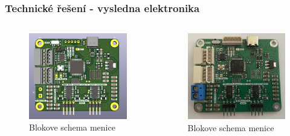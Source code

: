\documentclass[%
  12pt,       				%
	t,                  %
	aspectratio=1610,   %
	unicode,						%
]{beamer}				    	%
\begin{document}
\begin{frame}
	\frametitle{Technické řešení - vysledna elektronika}
	\begin{columns}[T] 								%
		\begin{column}{0.5\textwidth}		%
			\begin{figure}%
				\centering	              %
				\includegraphics[width=0.8\columnwidth]{../Thesis/obrazky/pcb_rev2}
				\caption{Blokove schema menice}%
				\label{fig:sm4_block}
			\end{figure}
		\end{column}
		\begin{column}{0.5\textwidth}		%
			\begin{figure}%
				\centering
				\includegraphics[width=0.8\columnwidth]{../Thesis/obrazky/rev2}
				\caption{Blokove schema menice}%
				\label{fig:sm4_block}
			\end{figure}
		\end{column}
	\end{columns}
\end{frame}
\end{document}
